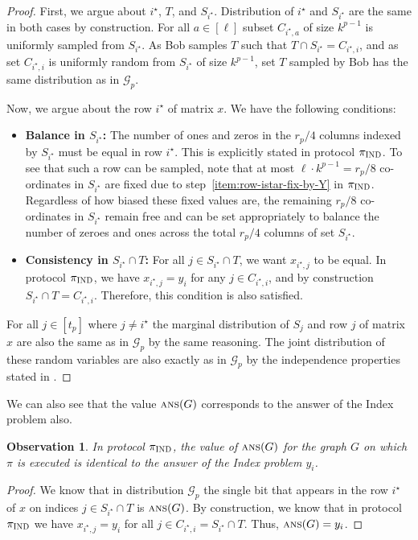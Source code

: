 \documentclass[11pt]{article}
\newtheorem{observation}[lemma]{Observation}
\theoremstyle{definition}
\newcommand{\cG}{\ensuremath{\mathcal{G}}}
\newcommand{\ans}{\ensuremath{\textnormal{\textsc{ans}}}}
\newcommand{\istar}{\ensuremath{i^{\star}}}
\newcommand{\prot}{\ensuremath{\pi}}
\newcommand{\protindex}{\ensuremath{\prot_{\textnormal{\textsc{IND}}}}}
\begin{document}
	\begin{proof}
		First, we argue about $\istar$, $T$, and $S_\istar$. Distribution of $\istar$ and $S_\istar$ are the same in both cases by construction. For all $a\in[\ell]$ subset $C_{\istar, a}$ of size $k^{p-1}$ is uniformly sampled from $S_\istar$. As Bob samples $T$ such that $T \cap S_\istar = C_{\istar, i}$, and as set $C_{\istar, i}$ is uniformly random from $S_{\istar}$ of size $k^{p-1}$, set $T$ sampled by Bob has the same distribution as in $\cG_p$.
		
		Now, we argue about the row $\istar$ of matrix $x$. We have the following conditions:
		\begin{itemize}
			\item \textbf{Balance in $S_{\istar}$:} The number of ones and zeros in the $r_p/4$ columns indexed by $S_{\istar}$ must be equal in row $\istar$. This is explicitly stated in protocol $\protindex$. To see that such a row can be sampled, note that at most $\ell \cdot k^{p-1} = r_p/8$ co-ordinates in $S_{\istar}$ are fixed due to step~\ref{item:row-istar-fix-by-Y} in $\protindex$. Regardless of how biased these fixed values are, the remaining $r_p/8$ co-ordinates in $S_{\istar}$ remain free and can be set appropriately to balance the number of zeroes and ones across the total $r_p/4$ columns of set $S_{\istar}$.
			
			\item \textbf{Consistency in $S_{\istar} \cap T$:} For all $j\in S_\istar\cap T$, we want $x_{\istar, j}$ to be equal. In protocol $\protindex$, we have $x_{\istar, j} = y_i$ for any $j \in C_{\istar, i}$, and by construction $S_{\istar} \cap T = C_{\istar, i}$. Therefore, this condition is also satisfied. 
		\end{itemize}
		
		For all $j \in [t_p]$ where $j\neq \istar$ the marginal distribution of $S_j$ and row $j$ of matrix $x$ are also the same as in $\cG_p$ by the same reasoning. 
		The joint distribution of these random variables are also exactly as in $\cG_p$ by the independence properties stated in .
	\end{proof}
	
	We can also see that the value $\ans(G)$ corresponds to the answer of the Index problem also.
	\begin{observation}\label{obs:ans-index-same}
		In protocol $\protindex$, the value of $\ans(G)$ for the graph $G$ on which $\prot$ is executed is identical to the answer of the Index problem $y_i$.
	\end{observation}
	\begin{proof}
		We know that in distribution $\cG_p$ the single bit that appears in the row $\istar$ of $x$ on indices $j\in S_\istar\cap T$ is $\ans(G)$. By construction, we know that in protocol $\protindex$ we have $x_{\istar, j}=y_i$ for all $j\in C_{\istar, i}= S_\istar\cap T$. Thus, $\ans(G)=y_i$.
	\end{proof}
	
\end{document}
